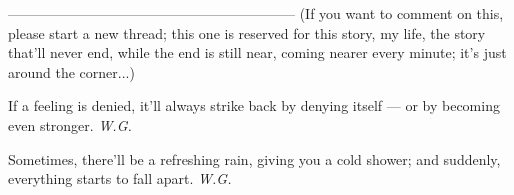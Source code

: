 --------------------------------------------------------------
(If you want to comment on this, please start a new thread; this one is reserved for this story, my life, the story that'll never end, while the end is still near, coming nearer every minute; it's just around the corner...)

If a feeling is denied, it'll always strike back by denying itself --- or by becoming even stronger. 
\emph{W.G.}

Sometimes, there'll be a refreshing rain, giving you a cold shower; and suddenly, everything starts to fall apart. 
\emph{W.G.}
